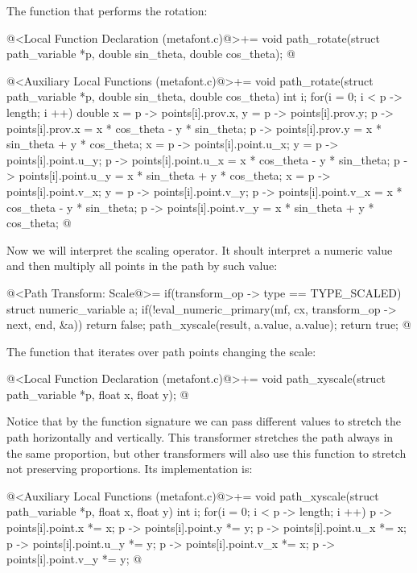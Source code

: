 {{{{{The function that performs the rotation:

\iniciocodigo
@<Local Function Declaration (metafont.c)@>+=
void path_rotate(struct path_variable *p, double sin_theta,
                 double cos_theta);
@
\fimcodigo

\iniciocodigo
@<Auxiliary Local Functions (metafont.c)@>+=
void path_rotate(struct path_variable *p, double sin_theta,
                 double cos_theta){
  int i;
  for(i = 0; i < p -> length; i ++){
    double x = p -> points[i].prov.x, y = p -> points[i].prov.y;
    p -> points[i].prov.x = x * cos_theta - y * sin_theta;
    p -> points[i].prov.y = x * sin_theta + y * cos_theta;
    x = p -> points[i].point.u_x;
    y = p -> points[i].point.u_y;
    p -> points[i].point.u_x = x * cos_theta - y * sin_theta;
    p -> points[i].point.u_y = x * sin_theta + y * cos_theta;
    x = p -> points[i].point.v_x;
    y = p -> points[i].point.v_y;
    p -> points[i].point.v_x = x * cos_theta - y * sin_theta;
    p -> points[i].point.v_y = x * sin_theta + y * cos_theta;
  }
}
@
\fimcodigo

Now we will interpret the scaling operator. It shoult interpret a
numeric value and then multiply all points in the path by such value:

\iniciocodigo
@<Path Transform: Scale@>=
if(transform_op -> type == TYPE_SCALED){
  struct numeric_variable a;
  if(!eval_numeric_primary(mf, cx, transform_op -> next, end, &a))
    return false;
  path_xyscale(result, a.value, a.value);  
  return true;
}
@
\fimcodigo

The function that iterates over path points changing the scale:

\iniciocodigo
@<Local Function Declaration (metafont.c)@>+=
void path_xyscale(struct path_variable *p, float x, float y);
@
\fimcodigo

Notice that by the function signature we can pass different values to
stretch the path horizontally and vertically. This transformer
stretches the path always in the same proportion, but other
transformers will also use this function to stretch not preserving
proportions. Its implementation is:

\iniciocodigo
@<Auxiliary Local Functions (metafont.c)@>+=
void path_xyscale(struct path_variable *p, float x, float y){
  int i;
  for(i = 0; i < p -> length; i ++){
    p -> points[i].point.x *= x;
    p -> points[i].point.y *= y;
    p -> points[i].point.u_x *= x;
    p -> points[i].point.u_y *= y;
    p -> points[i].point.v_x *= x;
    p -> points[i].point.v_y *= y;
  }
}
@
\fimcodigo

}}}}}
